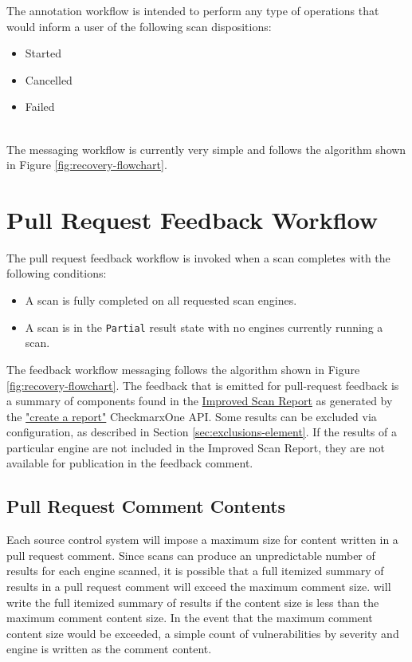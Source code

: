 The annotation workflow is intended to perform any type of operations that
would inform a user of the following scan dispositions:

\begin{itemize}
    \item Started
    \item Cancelled
    \item Failed
\end{itemize}

\noindent\\The messaging workflow is currently very simple and follows the algorithm
shown in Figure \ref{fig:recovery-flowchart}.

\section{Pull Request Feedback Workflow}\label{sec:pull-request-workflow}

The pull request feedback workflow is invoked when a scan completes with the
following conditions:

\begin{itemize}
    \item A scan is fully completed on all requested scan engines.
    \item A scan is in the \texttt{Partial} result state with no
    engines currently running a scan.
\end{itemize}

The feedback workflow messaging follows the algorithm shown in
Figure \ref{fig:recovery-flowchart}.  The feedback that is emitted
for pull-request feedback is a summary of components found in the
\href{https://docs.checkmarx.com/en/34965-182434-checkmarx-one-reporting.html}{Improved Scan Report}
as generated by the
\href{https://checkmarx.stoplight.io/docs/checkmarx-one-api-reference-guide/branches/main/7bf86350cfe72-create-a-report}{"create a report"}
CheckmarxOne API.  Some results can be excluded via configuration,
as described in Section \ref{sec:exclusions-element}.  If the results of a particular
engine are not included in the Improved Scan Report, they are not available for
publication in the feedback comment.

\subsection{Pull Request Comment Contents}

Each source control system will impose a maximum size for content written in
a pull request comment.  Since scans can produce an unpredictable number of
results for each engine scanned, it is possible that a full itemized
summary of results in a pull request comment will exceed the maximum comment
size.  \cxoneflow will write the full itemized summary of results if the
content size is less than the maximum comment content size.  In the event that
the maximum comment content size would be exceeded, a simple count of
vulnerabilities by severity and engine is written as the comment content.


